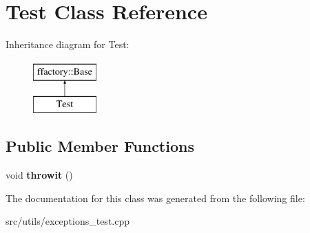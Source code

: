 \hypertarget{class_test}{}\section{Test Class Reference}
\label{class_test}
Inheritance diagram for Test\+:\begin{figure}[H]
\begin{center}
\leavevmode
\includegraphics[height=2.000000cm]{class_test}
\end{center}
\end{figure}
\subsection*{Public Member Functions}
\begin{DoxyCompactItemize}
\item 
\hypertarget{class_test_add0cfd00acb205c99f24a8677036514c}{}void {\bfseries throwit} ()\label{class_test_add0cfd00acb205c99f24a8677036514c}

\end{DoxyCompactItemize}


The documentation for this class was generated from the following file\+:\begin{DoxyCompactItemize}
\item 
src/utils/exceptions\+\_\+test.\+cpp\end{DoxyCompactItemize}
